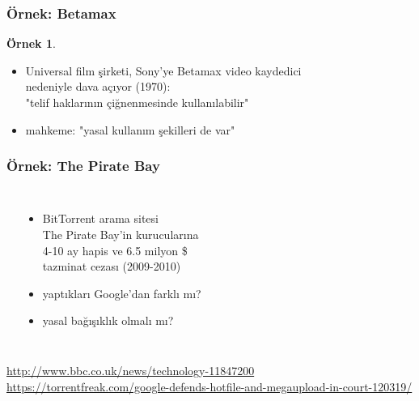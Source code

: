 \documentclass[dvipsnames]{beamer}
\theoremstyle{definition}
\theoremstyle{example}
\newtheorem{ornek}[theorem]{Örnek}
\theoremstyle{plain}
\begin{document}
\begin{frame}
  \frametitle{Örnek: Betamax}

  \begin{ornek}
    \begin{itemize}
      \item Universal film şirketi, Sony'ye Betamax video kaydedici\\
        nedeniyle dava açıyor (1970):\\
        "telif haklarının çiğnenmesinde kullanılabilir"
      \item mahkeme: "yasal kullanım şekilleri de var"
    \end{itemize}
  \end{ornek}
\end{frame}

\begin{frame}
  \frametitle{Örnek: The Pirate Bay}

  \begin{columns}
    \begin{center}
    \end{center}

    \begin{itemize}
      \item BitTorrent arama sitesi\\
        The Pirate Bay'in kurucularına\\
        4-10 ay hapis ve 6.5 milyon \$\\
        tazminat cezası (2009-2010)

      \pause
      \medskip
      \item yaptıkları Google'dan farklı mı?
      \item yasal bağışıklık olmalı mı?
    \end{itemize}
  \end{columns}

  \medskip
  \tiny{\url{http://www.bbc.co.uk/news/technology-11847200}}\\
  \tiny{\url{https://torrentfreak.com/google-defends-hotfile-and-megaupload-in-court-120319/}}\\
\end{frame}
\end{document}
